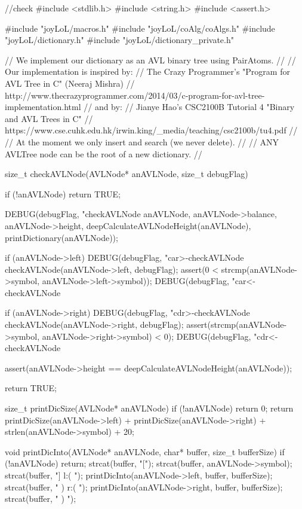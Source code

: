\stoptyping

\starttyping
//check
#include <stdlib.h>
#include <string.h>
#include <assert.h>

#include "joyLoL/macros.h"
#include "joyLoL/coAlg/coAlgs.h"
#include "joyLoL/dictionary.h"
#include "joyLoL/dictionary_private.h"

// We implement our dictionary as an AVL binary tree using PairAtoms.
//
// Our implementation is inspired by:
// The Crazy Programmer's "Program for AVL Tree in C" (Neeraj Mishra)
// http://www.thecrazyprogrammer.com/2014/03/c-program-for-avl-tree-implementation.html
// and by:
// Jianye Hao's CSC2100B Tutorial 4 "Binary and AVL Trees in C"
// https://www.cse.cuhk.edu.hk/irwin.king/_media/teaching/csc2100b/tu4.pdf
//
// At the moment we only insert and search (we never delete).
//
// ANY AVLTree node can be the root of a new dictionary.
//

size_t checkAVLNode(AVLNode* anAVLNode, size_t debugFlag) {
  if (!anAVLNode) return TRUE;

  DEBUG(debugFlag, "checkAVLNode %
        anAVLNode, anAVLNode->balance, anAVLNode->height,
        deepCalculateAVLNodeHeight(anAVLNode),
        printDictionary(anAVLNode));

  if (anAVLNode->left) {
    DEBUG(debugFlag, "car>-checkAVLNode %
    checkAVLNode(anAVLNode->left, debugFlag);
    assert(0 < strcmp(anAVLNode->symbol,
                      anAVLNode->left->symbol));
    DEBUG(debugFlag, "car<-checkAVLNode %
  }

  if (anAVLNode->right) {
    DEBUG(debugFlag, "cdr>-checkAVLNode %
    checkAVLNode(anAVLNode->right, debugFlag);
    assert(strcmp(anAVLNode->symbol,
                  anAVLNode->right->symbol) < 0);
    DEBUG(debugFlag, "cdr<-checkAVLNode %
  }

  assert(anAVLNode->height == deepCalculateAVLNodeHeight(anAVLNode));

  return TRUE;
}

size_t printDicSize(AVLNode* anAVLNode) {
  if (!anAVLNode) return 0;
  return printDicSize(anAVLNode->left)
    + printDicSize(anAVLNode->right)
    + strlen(anAVLNode->symbol) + 20;
}

void printDicInto(AVLNode* anAVLNode, char* buffer, size_t bufferSize) {
  if (!anAVLNode) return;
  strcat(buffer, "[");
  strcat(buffer, anAVLNode->symbol);
  strcat(buffer, "] l:( ");
  printDicInto(anAVLNode->left, buffer, bufferSize);
  strcat(buffer, " ) r:( ");
  printDicInto(anAVLNode->right, buffer, bufferSize);
  strcat(buffer, " ) ");
}

